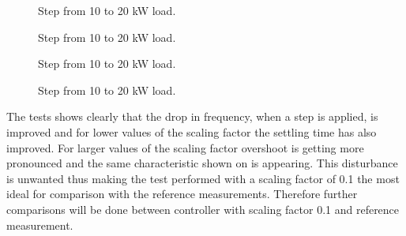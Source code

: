    
\begin{figure}[H]
\centering

\caption{Step from 10 to 20 kW load. }
\label{fig:test8+11freq10to20kwstep}
\end{figure}

\begin{figure}[H]
\centering

\caption{Step from 10 to 20 kW load. }
\label{fig:test8+12freq10to20kwstep}
\end{figure}

\begin{figure}[H]
\centering

\caption{Step from 10 to 20 kW load. }
\label{fig:test8+13freq10to20kwstep}
\end{figure}

\begin{figure}[H]
\centering

\caption{Step from 10 to 20 kW load. }
\label{fig:test8+14freq10to20kwstep}
\end{figure}

The tests shows clearly that the drop in frequency, when a step is applied, is improved and for lower values of the scaling factor the settling time has also improved. For larger values of the scaling factor overshoot is getting more pronounced and the same characteristic shown on  is appearing. This disturbance is unwanted thus making the test performed with a scaling factor of 0.1 the most ideal for comparison with the reference measurements.  Therefore further comparisons will be done between controller with scaling factor 0.1 and reference measurement.


